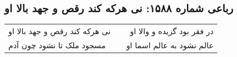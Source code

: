 \begin{center}
\section*{رباعی شماره ۱۵۸۸: نی هرکه کند رقص و جهد بالا او}
\label{sec:1588}
\begin{longtable}{l p{0.5cm} r}
نی هرکه کند رقص و جهد بالا او
&&
در فقر بود گزیده و والا او
\\
مسجود ملک تا نشود چون آدم
&&
عالم نشود به عالم اسما او
\\
\end{longtable}
\end{center}
